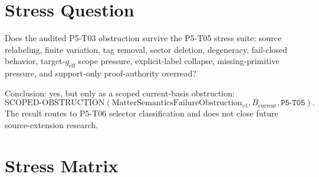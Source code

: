 \documentclass[11pt]{article}
\newcommand{\geff}{g_{\mathrm{eff}}}
\newcommand{\Obstruction}{\mathrm{MatterSemanticsFailureObstruction}_{v1}}
\newcommand{\Bcur}{B_{\mathrm{current}}}
\newcommand{\ScopedObstruction}{\mathrm{SCOPED\mbox{-}OBSTRUCTION}}
\begin{document}
\section{Stress Question}

Does the audited P5-T03 obstruction survive the P5-T05 stress suite: source
relabeling, finite variation, tag removal, sector deletion, degeneracy,
fail-closed behavior, target-\(\geff\) scope pressure, explicit-label
collapse, missing-primitive pressure, and support-only proof-authority
overread?

Conclusion: yes, but only as a scoped current-basis obstruction:
\[
  \ScopedObstruction(\Obstruction,\Bcur,\texttt{P5-T05}).
\]
The result routes to P5-T06 selector classification and does not close future
source-extension research.

\section{Stress Matrix}
\end{document}
